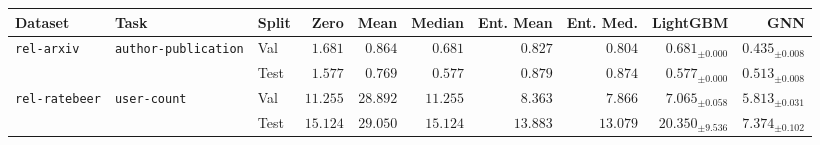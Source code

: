 \begin{tabular}{lllrrrrrrr}
\toprule
Dataset & Task & Split & Zero & Mean & Median & Ent. Mean & Ent. Med. & LightGBM & GNN \\
\midrule
\multirow[c]{2}{*}{\texttt{rel-arxiv}} & \multirow[c]{2}{*}{\texttt{author-publication}} & Val & $1.681$ & $0.864$ & $0.681$ & $0.827$ & $0.804$ & $0.681_{\pm 0.000}$ & $\bm{0.435}_{\pm 0.008}$ \\
 &  & Test & $1.577$ & $0.769$ & $0.577$ & $0.879$ & $0.874$ & $0.577_{\pm 0.000}$ & $\bm{0.513}_{\pm 0.008}$ \\
\cmidrule{1-10} \cmidrule{2-10}
\multirow[c]{2}{*}{\texttt{rel-ratebeer}} & \multirow[c]{2}{*}{\texttt{user-count}} & Val & $11.255$ & $28.892$ & $11.255$ & $8.363$ & $7.866$ & $7.065_{\pm 0.058}$ & $\bm{5.813}_{\pm 0.031}$ \\
 &  & Test & $15.124$ & $29.050$ & $15.124$ & $13.883$ & $13.079$ & $20.350_{\pm 9.536}$ & $\bm{7.374}_{\pm 0.102}$ \\
\bottomrule
\end{tabular}
